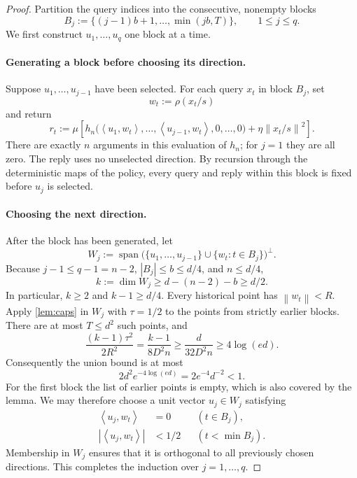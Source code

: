 \documentclass[11pt]{article}
\numberwithin{equation}{section}
\theoremstyle{definition}
\theoremstyle{remark}
\newcommand{\norm}[1]{\left\lVert #1\right\rVert}
\newcommand{\ip}[2]{\left\langle #1,#2\right\rangle}
\newcommand{\Span}{\operatorname{span}}
\begin{document}
\begin{proof}
Partition the query indices into the consecutive, nonempty blocks
\[
    B_j:=\{(j-1)b+1,\ldots,\min(jb,T)\},\qquad 1\leq j\leq q.
\]
We first construct $u_1,\ldots,u_q$ one block at a time.

\paragraph{Generating a block before choosing its direction.}
Suppose $u_1,\ldots,u_{j-1}$ have been selected. For each query $x_t$ in
block $B_j$, set
\begin{equation}
    w_t:=\rho(x_t/s)
    \label{eq:wt}
\end{equation}
and return
\begin{equation}
    r_t:=\mu\left[
      h_n\bigl(\ip{u_1}{w_t},\ldots,\ip{u_{j-1}}{w_t},0,\ldots,0\bigr)
         +\eta\norm{x_t/s}^2\right].
    \label{eq:online-reply}
\end{equation}
There are exactly $n$ arguments in this evaluation of $h_n$; for $j=1$
they are all zero. The reply uses no unselected direction.
By recursion through the deterministic maps of the policy, every query
and reply within this block is fixed before $u_j$ is selected.

\paragraph{Choosing the next direction.}
After the block has been generated, let
\begin{equation}
    W_j:=\Span\bigl(\{u_1,\ldots,u_{j-1}\}
                     \cup\{w_t:t\in B_j\}\bigr)^\perp.
    \label{eq:Wj}
\end{equation}
Because $j-1\leq q-1=n-2$, $|B_j|\leq b\leq d/4$, and $n\leq d/4$,
\begin{equation}
    k:=\dim W_j\geq d-(n-2)-b\geq d/2.
    \label{eq:dimension}
\end{equation}
In particular, $k\geq2$ and $k-1\geq d/4$.
Every historical point has $\norm{w_t}<R$.
Apply \cref{lem:caps} in $W_j$ with $\tau=1/2$ to the points from strictly
earlier blocks. There are at most $T\leq d^2$ such points, and
\begin{equation}
    \frac{(k-1)\tau^2}{2R^2}
    =\frac{k-1}{8D^2n}\geq\frac{d}{32D^2n}
    \geq4\log(ed).
    \label{eq:cap-exponent}
\end{equation}
Consequently the union bound is at most
\[
    2d^2e^{-4\log(ed)}=2e^{-4}d^{-2}<1.
\]
For the first block the list of earlier points is empty, which is also
covered by the lemma. We may therefore choose a unit vector $u_j\in W_j$
satisfying
\begin{equation}
\begin{aligned}
    \ip{u_j}{w_t}&=0 &&(t\in B_j),\\
    |\ip{u_j}{w_t}|&<1/2 &&(t<\min B_j).
\end{aligned}
\label{eq:direction-invariant}
\end{equation}
Membership in $W_j$ ensures that it is orthogonal to all previously chosen
directions. This completes the induction over $j=1,\ldots,q$.


\end{proof}
\end{document}
